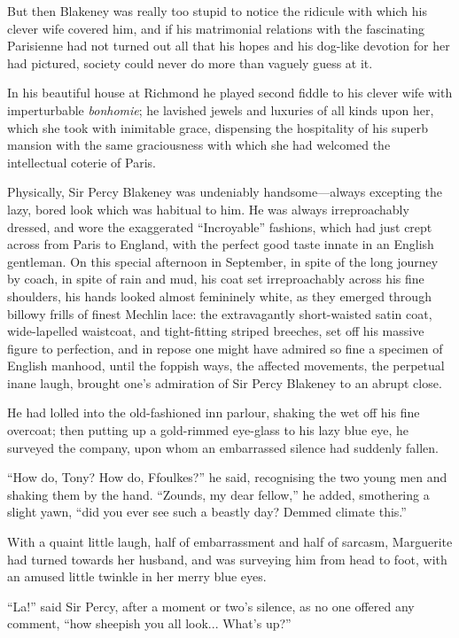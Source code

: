 \documentclass[paper=a5,BCOR=7mm,twoside,DIV=calc,12pt,usegeometry,chapterprefix,endperiod,headings=big]{scrbook}
\begin{document}
But then Blakeney was really too stupid to notice the ridicule with which his clever wife covered him, and if his matrimonial relations with the fascinating Parisienne had not turned out all that his hopes and his dog-like devotion for her had pictured, society could never do more than vaguely guess at it.

In his beautiful house at Richmond he played second fiddle to his clever wife with imperturbable \textit{bonhomie}; he lavished jewels and luxuries of all kinds upon her, which she took with inimitable grace, dispensing the hospitality of his superb mansion with the same graciousness with which she had welcomed the intellectual coterie of Paris.

Physically, Sir Percy Blakeney was undeniably  handsome---always excepting the lazy, bored look which was habitual to him. He was always irreproachably dressed, and wore the exaggerated \enquote{Incroyable} fashions, which had just crept across from Paris to England, with the perfect good taste innate in an English gentleman. On this special afternoon in September, in spite of the long journey by coach, in spite of rain and mud, his coat set irreproachably across his fine shoulders, his hands looked almost femininely white, as they emerged through billowy frills of finest Mechlin lace: the extravagantly short-waisted satin coat, wide-lapelled waistcoat, and tight-fitting striped breeches, set off his massive figure to perfection, and in repose one might have admired so fine a specimen of English manhood, until the foppish ways, the affected movements, the perpetual inane laugh, brought one's admiration of Sir Percy Blakeney to an abrupt close.

He had lolled into the old-fashioned inn parlour, shaking the wet off his fine overcoat; then putting up a gold-rimmed eye-glass to his lazy blue eye, he surveyed the company, upon whom an embarrassed silence had suddenly fallen.

\enquote{How do, Tony? How do, Ffoulkes?} he said, recognising the two young men and shaking them by the hand. \enquote{Zounds, my dear fellow,} he added, smothering a slight yawn, \enquote{did you ever see such a beastly day? Demmed climate this.}

With a quaint little laugh, half of embarrassment and half of sarcasm, Marguerite had turned towards her husband, and was surveying him from head to foot, with an amused little twinkle in her merry blue eyes.

\enquote{La!} said Sir Percy, after a moment or two's silence, as no one offered any comment, \enquote{how sheepish you all look... What's up?}
\end{document}
